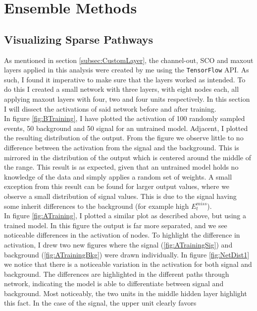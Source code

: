 \section{Ensemble Methods}\label{sec:Ensemble}
\subsection{Visualizing Sparse Pathways}\label{subsec:Viz}
As mentioned in section \ref{subsec:CustomLayer}, the channel-out, \ac{SCO} and maxout layers applied in this 
analysis were created by me using the \verb!TensorFlow! \ac{API}. As such, I found it imperative to make
sure that the layers worked as intended. To do this I created a small network with three layers, with eight 
nodes each, all applying maxout layers with four, two and four units respectively. In this section I will 
dissect the activations of said network before and after training.
\\
In figure \ref{fig:BTraining}, I have plotted the activation of 100 randomly sampled events, 50 
background and 50 signal for an untrained model. Adjacent, I plotted the resulting distribution of the 
output. From the figure we observe little to no difference between the activation from the signal and 
the background. This is mirrored in the distribution of the output which is centered around the middle 
of the range. This result is as expected, given that an untrained model holds no knowledge of the data and 
simply applies a random set of weights. A small exception from this result can be found for larger output values, 
where we observe a small distribution of signal values. This is due to the signal having some inherit differences
to the background (for example high $E_t^{miss}$).
\\
In figure \ref{fig:ATraining}, I plotted a similar plot as described above, but using a trained model.
In this figure the output is far more separated, and we see noticeable differences in the activation 
of nodes. To highlight the difference in activation, I drew two new figures where the signal 
(\ref{fig:ATrainingSig}) and background (\ref{fig:ATrainingBkg}) were drawn individually.
In figure \ref{fig:NetDist1} we notice that there is a noticeable variation in the activation for
both signal and background. The differences are highlighted in the different paths through network, indicating the
model is able to differentiate between signal and background. Most noticeably, the two units 
in the middle hidden layer highlight this fact. In the case of the signal, the upper unit clearly favors 
